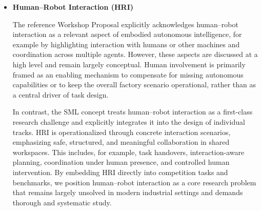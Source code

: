 \documentclass[letterpaper, 11pt]{extarticle}
\begin{document}
\begin{itemize}
In the reference Workshop Proposal, scores from all tracks are combined into a single cumulative result. This design encourages participation across all tracks and fosters long-term collaboration between teams, emphasizing collective engagement rather than specialization. 

In contrast, the SML concept implements a best-in-class scoring system, recognizing team performance within specialized tracks and enabling track-specific metrics that capture the unique challenges of each domain without forcing a comparison across fundamentally different tasks. Simultaneously, a unified factory challenge evaluates generalization, rewarding systems that can successfully tackle multiple tracks at once. This dual structure encourages both deep expertise in individual areas and the development of versatile, all-rounder robotic solutions.  

Beyond scoring, the expert tracks are designed to operate within a single integrated production scenario. Competitions for each track are intended to be hosted simultaneously on the same field, allowing the tracks to interact organically.


\item \textbf{Human–Robot Interaction (HRI)}

The reference Workshop Proposal explicitly acknowledges human–robot interaction as a relevant aspect of embodied autonomous intelligence, for example by highlighting interaction with humans or other machines and coordination across multiple agents.
However, these aspects are discussed at a high level and remain largely conceptual.
Human involvement is primarily framed as an enabling mechanism to compensate for missing autonomous capabilities or to keep the overall factory scenario operational, rather than as a central driver of task design.

In contrast, the SML concept treats human–robot interaction as a first-class research challenge and explicitly integrates it into the design of individual tracks.
HRI is operationalized through concrete interaction scenarios, emphasizing safe, structured, and meaningful collaboration in shared workspaces.
This includes, for example, task handovers, interaction-aware planning, coordination under human presence, and controlled human intervention.
By embedding HRI directly into competition tasks and benchmarks, we position human–robot interaction as a core research problem that remains largely unsolved in modern industrial settings and demands thorough and systematic study.


\end{itemize}
\end{document}

